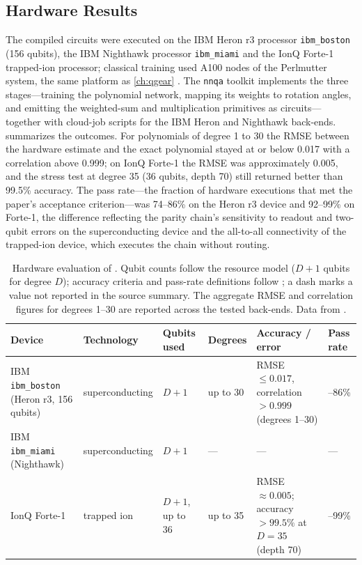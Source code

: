 \subsection{Hardware Results}\label{sec:qml:nnqa:hw}

The compiled circuits were executed on the IBM Heron r3 processor \texttt{ibm\_boston} (156 qubits), the IBM Nighthawk processor \texttt{ibm\_miami} and the IonQ Forte-1 trapped-ion processor; classical training used A100 nodes of the Perlmutter system, the same platform as \cref{ch:qgear} \cite{guo2026nnqa}. The \texttt{nnqa} toolkit implements the three stages---training the polynomial network, mapping its weights to rotation angles, and emitting the weighted-sum and multiplication primitives as \qiskit{} circuits---together with cloud-job scripts for the IBM Heron and Nighthawk back-ends.  summarizes the outcomes. For polynomials of degree 1 to 30 the RMSE between the hardware estimate and the exact polynomial stayed at or below 0.017 with a correlation above 0.999; on IonQ Forte-1 the RMSE was approximately 0.005, and the stress test at degree 35 (36 qubits, depth 70) still returned better than 99.5\% accuracy. The pass rate---the fraction of hardware executions that met the paper's acceptance criterion---was 74--86\% on the Heron r3 device and 92--99\% on Forte-1, the difference reflecting the parity chain's sensitivity to readout and two-qubit errors on the superconducting device and the all-to-all connectivity of the trapped-ion device, which executes the chain without routing.

\begin{table}[htbp]
\caption{Hardware evaluation of \nnqa{}. Qubit counts follow the resource model ($D+1$ qubits for degree $D$); accuracy criteria and pass-rate definitions follow \cite{guo2026nnqa}; a dash marks a value not reported in the source summary. The aggregate RMSE and correlation figures for degrees 1--30 are reported across the tested back-ends. Data from \cite{guo2026nnqa}.}\label{tab:qml:nnqa-hw}
\centering
\footnotesize
\setlength{\tabcolsep}{5pt}
\begin{tabular}{@{}>{\raggedright\arraybackslash}p{3.3cm}>{\raggedright\arraybackslash}p{2.1cm}>{\raggedright\arraybackslash}p{1.4cm}>{\raggedright\arraybackslash}p{1.3cm}>{\raggedright\arraybackslash}p{3.6cm}>{\raggedright\arraybackslash}p{1.5cm}@{}}
\toprule
Device & Technology & Qubits used & Degrees & Accuracy / error & Pass rate \\
\midrule
IBM \texttt{ibm\_boston} (Heron r3, 156 qubits) & superconducting & $D+1$ & up to 30 & RMSE $\le 0.017$, correlation $> 0.999$ (degrees 1--30) & 74--86\% \\
\addlinespace
IBM \texttt{ibm\_miami} (Nighthawk) & superconducting & $D+1$ & --- & --- & --- \\
\addlinespace
IonQ Forte-1 & trapped ion & $D+1$, up to 36 & up to 35 & RMSE $\approx 0.005$; accuracy $>99.5\%$ at $D{=}35$ (depth 70) & 92--99\% \\
\bottomrule
\end{tabular}
\end{table}

